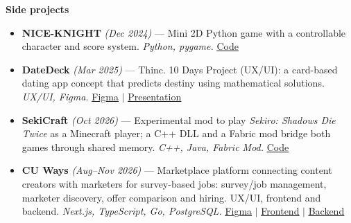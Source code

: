 \documentclass[11pt,a4paper]{article}
\let\oldhref\href
\renewcommand{\href}[2]{\oldhref{#1}{\uline{#2}}}
\begin{document}
\textbf{Side projects}
\begin{itemize}
  \item \textbf{NICE-KNIGHT} \textit{(Dec 2024)} --- Mini 2D Python game with a controllable character and score system. \textit{Python, pygame.} \href{https://github.com/NIHKOOL/NICE-KNIGHT}{Code}
  \item \textbf{DateDeck} \textit{(Mar 2025)} --- Thinc. 10 Days Project (UX/UI): a card-based dating app concept that predicts destiny using mathematical solutions. \textit{UX/UI, Figma.} \href{https://www.figma.com/design/FRunFDWanLf1aC9BhrR9Vx/10_DAY_PG}{Figma} $\mid$ \href{https://www.canva.com/design/DAGh5MFsft0/31cRJCzz3CAbhAzJuCZLPA/view}{Presentation}
  \item \textbf{SekiCraft} \textit{(Oct 2026)} --- Experimental mod to play \textit{Sekiro: Shadows Die Twice} as a Minecraft player; a C++ DLL and a Fabric mod bridge both games through shared memory. \textit{C++, Java, Fabric Mod.} \href{https://github.com/NIHKOOL/SekiCraft}{Code}
  \item \textbf{CU Ways} \textit{(Aug--Nov 2026)} --- Marketplace platform connecting content creators with marketers for survey-based jobs: survey/job management, marketer discovery, offer comparison and hiring. UX/UI, frontend and backend. \textit{Next.js, TypeScript, Go, PostgreSQL.} \href{https://www.figma.com/design/XMwuViKKwBvZFBqsVP6PAx/SE-UX-UI}{Figma} $\mid$ \href{https://github.com/Champy2005/cu-ways-frontend}{Frontend} $\mid$ \href{https://github.com/Aluminium51/cu-ways-backend}{Backend}
\end{itemize}

\end{document}
